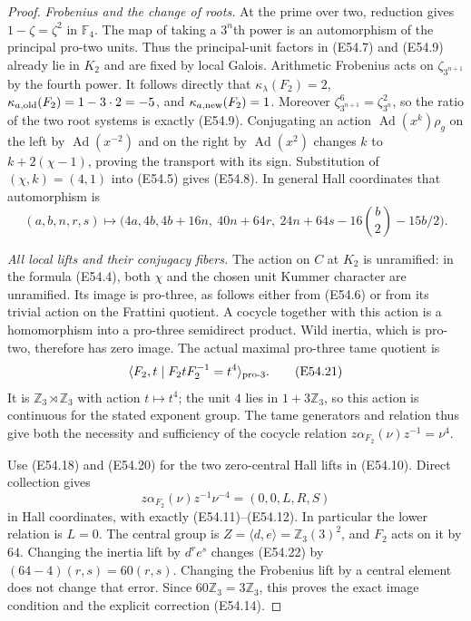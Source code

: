 \begin{proof}
\emph{Frobenius and the change of roots.}
At the prime over two, reduction gives
$1-\zeta=\zeta^2$ in $\mathbb F_4$.
The map of taking a $3^n$th power is an automorphism
of the principal pro-two units. Thus the principal-unit
factors in (E54.7) and (E54.9) already lie in $K_2$
and are fixed by local Galois. Arithmetic Frobenius
acts on $\zeta_{3^{n+1}}$ by the fourth power.
It follows directly that
$\kappa_\lambda(F_2)=2$,
$\kappa_{a,{\rm old}}(F_2)=1-3\cdot2=-5$,
and $\kappa_{a,{\rm new}}(F_2)=1$.
Moreover
$\zeta_{3^{n+1}}^6=\zeta_{3^n}^2$, so the ratio of
the two root systems is exactly (E54.9).
Conjugating an action
$\operatorname{Ad}(x^k)\rho_g$ on the left by
$\operatorname{Ad}(x^{-2})$ and on the right by
$\operatorname{Ad}(x^2)$ changes $k$ to
$k+2(\chi-1)$, proving the transport with its sign.
Substitution of $(\chi,k)=(4,1)$ into (E54.5) gives
(E54.8). In general Hall coordinates that automorphism is
\[
 (a,b,n,r,s)\longmapsto
 \bigl(4a,4b,4b+16n,\ 40n+64r,\
       24n+64s-16\binom b2-15b/2\bigr).
 \tag{E54.20}
\]

\emph{All local lifts and their conjugacy fibers.}
The action on $C$ at $K_2$ is unramified: in the formula
(E54.4), both $\chi$ and the chosen unit Kummer character
are unramified. Its image is pro-three, as follows either
from (E54.6) or from its trivial action on the Frattini
quotient. A cocycle together with this action is a
homomorphism into a pro-three semidirect product.
Wild inertia, which is pro-two, therefore has zero image.
The actual maximal pro-three tame quotient is
\[
       \langle F_2,t\mid F_2tF_2^{-1}=t^4\rangle_{\rm pro\text{-}3}.
 \tag{E54.21}
\]
It is $\mathbb Z_3\rtimes\mathbb Z_3$ with action
$t\mapsto t^4$; the unit $4$ lies in $1+3\mathbb Z_3$,
so this action is continuous for the stated exponent
group. The tame generators and relation thus give both
the necessity and sufficiency of the cocycle relation
$z\alpha_{F_2}(\nu)z^{-1}=\nu^4$.

Use (E54.18) and (E54.20) for the two zero-central Hall
lifts in (E54.10). Direct collection gives
\[
 z\alpha_{F_2}(\nu)z^{-1}\nu^{-4}=(0,0,L,R,S)
 \tag{E54.22}
\]
in Hall coordinates, with exactly (E54.11)--(E54.12).
In particular the lower relation is $L=0$.
The central group is
$Z=\langle d,e\rangle=\mathbb Z_3(3)^2$,
and $F_2$ acts on it by $64$.
Changing the inertia lift by $d^r e^s$ changes
(E54.22) by $(64-4)(r,s)=60(r,s)$.
Changing the Frobenius lift by a central element
does not change that error.
Since $60\mathbb Z_3=3\mathbb Z_3$,
this proves the exact image condition and the
explicit correction (E54.14).


\end{proof}
